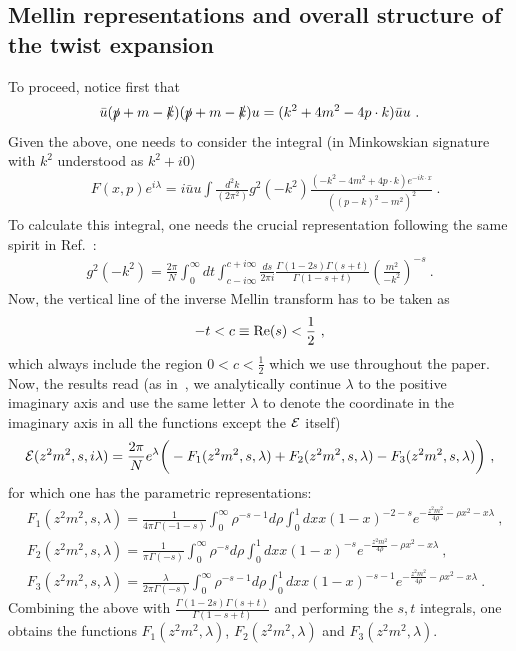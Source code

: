 \documentclass[a4paper,11pt]{article}
\begin{document}
\subsection{Mellin representations and overall structure of the twist expansion}
To proceed, notice first that
\begin{align}
\bar u (\slashed{p}+m-\slashed{k})(\slashed{p}+m-\slashed{k})u=(k^2+4m^2-4p\cdot k)\bar u u \ .
\end{align}
Given the above, one needs to consider the integral (in Minkowskian signature with $k^2$ understood as $k^2+i0$)
\begin{align}
&F(x,p)e^{i\lambda}=i\bar u u\int\frac{d^2k}{(2\pi^2)}g^2(-k^2)\frac{(-k^2-4m^2+4p\cdot k)e^{-ik\cdot x}}{((p-k)^2-m^2)^2} \ .
\end{align}
To calculate this integral,  one needs the crucial representation following the same spirit in Ref.~\cite{Beneke:1998eq}:
\begin{align}
g^2(-k^2)=\frac{2\pi}{N} \int_{0}^{\infty} dt \int_{c-i\infty}^{c+i\infty} \frac{ds}{2\pi i}\frac{\Gamma(1-2s)\Gamma(s+t)}{\Gamma(1-s+t)} \left(\frac{m^2}{-k^2}\right)^{-s} \ .
\end{align}
Now, the vertical line of the inverse Mellin transform has to be taken as
\begin{align}
-t<c \equiv {\rm Re}(s)<\frac{1}{2} \ ,
\end{align}
which always include the region $0<c<\frac{1}{2}$ which we use throughout the paper.  Now, the results read (as in~\cite{Liu:2023onm}, we analytically continue $\lambda$ to the positive imaginary axis and use the same letter $\lambda$ to denote the coordinate in the imaginary axis in all the functions except the ${\cal E}$ itself)
\begin{align}
{\cal E}(z^2m^2,s,i\lambda)=\frac{2\pi}{N}e^{\lambda}\bigg(-F_1(z^2m^2,s,\lambda)+F_2(z^2m^2,s,\lambda)-F_3(z^2m^2,s,\lambda)\bigg) \ , 
\end{align}
for which one has the parametric representations: 
\begin{align}
&F_1(z^2m^2,s,\lambda)=\frac{1}{4\pi \Gamma(-1-s)}\int_{0}^{\infty}\rho^{-s-1}d\rho\int_{0}^1 dx x(1-x)^{-2-s}e^{-\frac{z^2m^2}{4\rho}-\rho x^2-x\lambda} \ , \\ 
&F_2(z^2m^2,s,\lambda)=\frac{1}{\pi \Gamma(-s)}\int_{0}^{\infty}\rho^{-s}d\rho\int_{0}^1 dx x(1-x)^{-s}e^{-\frac{z^2m^2}{4\rho}-\rho x^2-x\lambda} \ , \\ 
&F_3(z^2m^2,s,\lambda)=\frac{\lambda}{2\pi \Gamma(-s)}\int_{0}^{\infty}\rho^{-s-1}d\rho\int_{0}^1 dx x(1-x)^{-s-1}e^{-\frac{z^2m^2}{4\rho}-\rho x^2-x\lambda} \ .
\end{align}
Combining the above with $\frac{\Gamma(1-2s)\Gamma(s+t)}{\Gamma(1-s+t)}$ and performing the $s,t$ integrals, one obtains the functions $F_1(z^2m^2,\lambda)$, $F_2(z^2m^2,\lambda)$ and $F_3(z^2m^2,\lambda)$. 
\end{document}
